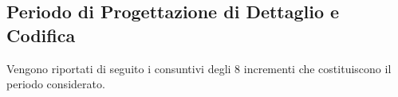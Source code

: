 \subsection{Periodo di Progettazione di Dettaglio e Codifica}
Vengono riportati di seguito i consuntivi degli 8 incrementi che costituiscono il periodo considerato. 










